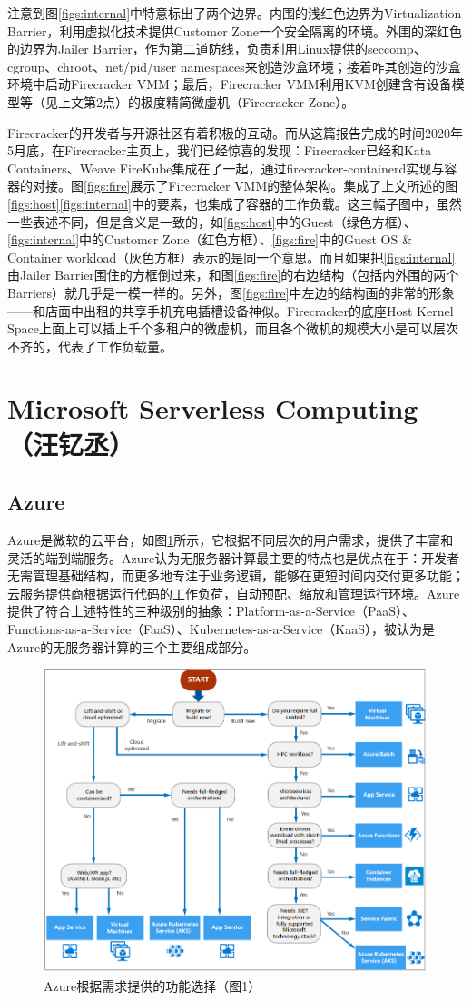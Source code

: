 \documentclass[11pt]{article}
\begin{document}
注意到图\ref{figs:internal}中特意标出了两个边界。内围的浅红色边界为Virtualization Barrier，利用虚拟化技术提供Customer Zone一个安全隔离的环境。外围的深红色的边界为Jailer Barrier，作为第二道防线，负责利用Linux提供的seccomp、cgroup、chroot、net/pid/user namespaces来创造沙盒环境；接着咋其创造的沙盒环境中启动Firecracker VMM；最后，Firecracker VMM利用KVM创建含有设备模型等（见上文第2点）的极度精简微虚机（Firecracker Zone）。

Firecracker的开发者与开源社区有着积极的互动。而从这篇报告完成的时间2020年5月底，在Firecracker主页上，我们已经惊喜的发现：Firecracker已经和Kata Containers、Weave FireKube集成在了一起，通过firecracker-containerd实现与容器的对接。图\ref{figs:fire}展示了Firecracker VMM的整体架构。集成了上文所述的图\ref{figs:host}\ref{figs:internal}中的要素，也集成了容器的工作负载。这三幅子图中，虽然一些表述不同，但是含义是一致的，如\ref{figs:host}中的Guest（绿色方框）、\ref{figs:internal}中的Customer Zone（红色方框）、\ref{figs:fire}中的Guest OS \& Container workload（灰色方框）表示的是同一个意思。而且如果把\ref{figs:internal}由Jailer Barrier围住的方框倒过来，和图\ref{figs:fire}的右边结构（包括内外围的两个Barriers）就几乎是一模一样的。另外，图\ref{figs:fire}中左边的结构画的非常的形象——和店面中出租的共享手机充电插槽设备神似。Firecracker的底座Host Kernel Space上面上可以插上千个多租户的微虚机，而且各个微机的规模大小是可以层次不齐的，代表了工作负载量。

\newpage
\section{Microsoft Serverless Computing（汪钇丞）}
\subsection{Azure}
Azure是微软的云平台，如图\ref{figs:Overview}所示，它根据不同层次的用户需求，提供了丰富和灵活的端到端服务\cite{overview}。Azure认为无服务器计算最主要的特点也是优点在于：开发者无需管理基础结构，而更多地专注于业务逻辑，能够在更短时间内交付更多功能；云服务提供商根据运行代码的工作负荷，自动预配、缩放和管理运行环境。Azure提供了符合上述特性的三种级别的抽象：Platform-as-a-Service（PaaS）、Functions-as-a-Service（FaaS）、Kubernetes-as-a-Service（KaaS），被认为是Azure的无服务器计算的三个主要组成部分。
\begin{figure}[!htbp]
	\centering
	\includegraphics[width=0.7\linewidth]{figs/AzureChoice.PNG}
	\caption{Azure根据需求提供的功能选择（\cite{overview}图1）}
	\label{figs:Overview}
\end{figure}
\end{document}
